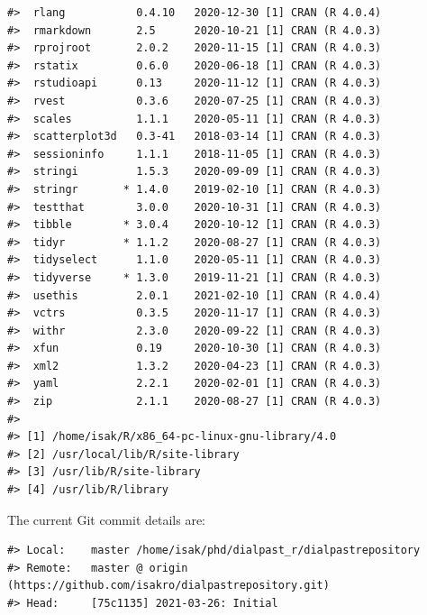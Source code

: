 \documentclass[
]{article}
\begin{document}
\begin{verbatim}
#>  rlang           0.4.10   2020-12-30 [1] CRAN (R 4.0.4)
#>  rmarkdown       2.5      2020-10-21 [1] CRAN (R 4.0.3)
#>  rprojroot       2.0.2    2020-11-15 [1] CRAN (R 4.0.3)
#>  rstatix         0.6.0    2020-06-18 [1] CRAN (R 4.0.3)
#>  rstudioapi      0.13     2020-11-12 [1] CRAN (R 4.0.3)
#>  rvest           0.3.6    2020-07-25 [1] CRAN (R 4.0.3)
#>  scales          1.1.1    2020-05-11 [1] CRAN (R 4.0.3)
#>  scatterplot3d   0.3-41   2018-03-14 [1] CRAN (R 4.0.3)
#>  sessioninfo     1.1.1    2018-11-05 [1] CRAN (R 4.0.3)
#>  stringi         1.5.3    2020-09-09 [1] CRAN (R 4.0.3)
#>  stringr       * 1.4.0    2019-02-10 [1] CRAN (R 4.0.3)
#>  testthat        3.0.0    2020-10-31 [1] CRAN (R 4.0.3)
#>  tibble        * 3.0.4    2020-10-12 [1] CRAN (R 4.0.3)
#>  tidyr         * 1.1.2    2020-08-27 [1] CRAN (R 4.0.3)
#>  tidyselect      1.1.0    2020-05-11 [1] CRAN (R 4.0.3)
#>  tidyverse     * 1.3.0    2019-11-21 [1] CRAN (R 4.0.3)
#>  usethis         2.0.1    2021-02-10 [1] CRAN (R 4.0.4)
#>  vctrs           0.3.5    2020-11-17 [1] CRAN (R 4.0.3)
#>  withr           2.3.0    2020-09-22 [1] CRAN (R 4.0.3)
#>  xfun            0.19     2020-10-30 [1] CRAN (R 4.0.3)
#>  xml2            1.3.2    2020-04-23 [1] CRAN (R 4.0.3)
#>  yaml            2.2.1    2020-02-01 [1] CRAN (R 4.0.3)
#>  zip             2.1.1    2020-08-27 [1] CRAN (R 4.0.3)
#> 
#> [1] /home/isak/R/x86_64-pc-linux-gnu-library/4.0
#> [2] /usr/local/lib/R/site-library
#> [3] /usr/lib/R/site-library
#> [4] /usr/lib/R/library
\end{verbatim}

The current Git commit details are:

\begin{verbatim}
#> Local:    master /home/isak/phd/dialpast_r/dialpastrepository
#> Remote:   master @ origin (https://github.com/isakro/dialpastrepository.git)
#> Head:     [75c1135] 2021-03-26: Initial
\end{verbatim}
\end{document}
